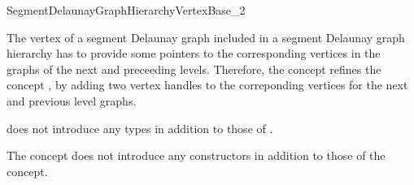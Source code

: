 

\begin{ccRefConcept}{SegmentDelaunayGraphHierarchyVertexBase_2}



\ccDefinition 
The vertex of a segment Delaunay graph
included in a segment Delaunay graph hierarchy has to provide
some pointers to the corresponding vertices in the
graphs of the next and preceeding levels.
Therefore, the concept 
refines the concept , by
adding two vertex handles to the correponding vertices for the
next and previous level graphs.


\ccRefines
{}


\ccTypes
{} does not introduce
any types in addition to those of
.


\ccCreation
{}  %
%

The  concept does not
introduce any constructors in addition to those of the
 concept.





\end{ccRefConcept}
